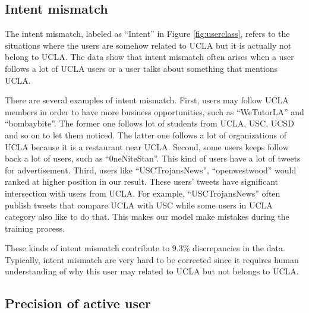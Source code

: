 \documentclass{article}
\begin{document}
\subsection{Intent mismatch}
The intent mismatch, labeled as ``Intent'' in Figure \ref{fig:userclass}, refers to the situations where the users are somehow related to UCLA but it is actually not belong to UCLA. The data show that intent mismatch often arises when a user follows a lot of UCLA users or a user talks about something that mentions UCLA.

There are several examples of intent mismatch. First, users may follow UCLA members in order to have more business opportunities, such as ``WeTutorLA'' and ``bombaybite''. The former one follows lot of students from UCLA, USC, UCSD and so on to let them noticed. The latter one follows a lot of organizations of UCLA because it is a restaurant near UCLA. Second, some users keeps follow back a lot of users, such as ``0neNiteStan''. This kind of users have a lot of tweets for advertisement. Third, users like ``USCTrojansNews'', ``openwestwood'' would ranked at higher position in our result. These users' tweets have significant intersection with users from UCLA. For example, ``USCTrojansNews'' often publish tweets that compare UCLA with USC while some users in UCLA category also like to do that. This makes our model make mistakes during the training process.

These kinds of intent mismatch contribute to $9.3\%$ discrepancies in the data. Typically, intent mismatch are very hard to be corrected since it requires human understanding of why this user may related to UCLA but not belongs to UCLA.

\subsection{Precision of active user}


\ifx \allfiles \undefined
\end{document}
